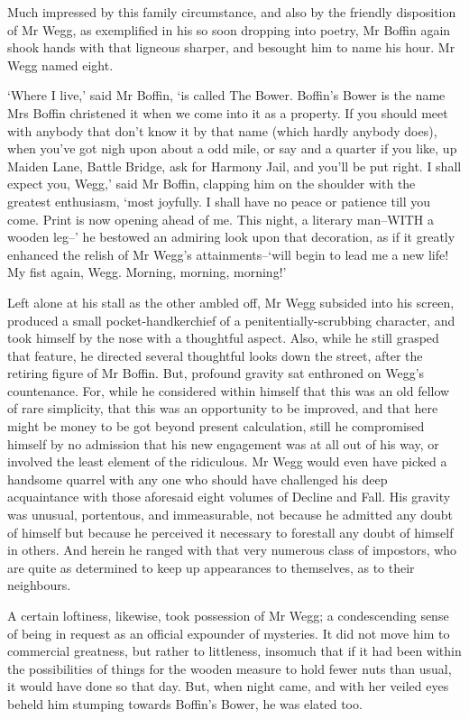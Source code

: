 Much impressed by this family circumstance, and also by the friendly
disposition of Mr Wegg, as exemplified in his so soon dropping into
poetry, Mr Boffin again shook hands with that ligneous sharper, and
besought him to name his hour. Mr Wegg named eight.

‘Where I live,’ said Mr Boffin, ‘is called The Bower. Boffin’s Bower is
the name Mrs Boffin christened it when we come into it as a property.
If you should meet with anybody that don’t know it by that name (which
hardly anybody does), when you’ve got nigh upon about a odd mile, or
say and a quarter if you like, up Maiden Lane, Battle Bridge, ask for
Harmony Jail, and you’ll be put right. I shall expect you, Wegg,’ said
Mr Boffin, clapping him on the shoulder with the greatest enthusiasm,
‘most joyfully. I shall have no peace or patience till you come. Print
is now opening ahead of me. This night, a literary man--WITH a wooden
leg--’ he bestowed an admiring look upon that decoration, as if it
greatly enhanced the relish of Mr Wegg’s attainments--‘will begin to
lead me a new life! My fist again, Wegg. Morning, morning, morning!’

Left alone at his stall as the other ambled off, Mr Wegg subsided
into his screen, produced a small pocket-handkerchief of a
penitentially-scrubbing character, and took himself by the nose with
a thoughtful aspect. Also, while he still grasped that feature, he
directed several thoughtful looks down the street, after the retiring
figure of Mr Boffin. But, profound gravity sat enthroned on Wegg’s
countenance. For, while he considered within himself that this was
an old fellow of rare simplicity, that this was an opportunity to
be improved, and that here might be money to be got beyond present
calculation, still he compromised himself by no admission that his new
engagement was at all out of his way, or involved the least element of
the ridiculous. Mr Wegg would even have picked a handsome quarrel with
any one who should have challenged his deep acquaintance with those
aforesaid eight volumes of Decline and Fall. His gravity was unusual,
portentous, and immeasurable, not because he admitted any doubt of
himself but because he perceived it necessary to forestall any doubt of
himself in others. And herein he ranged with that very numerous class
of impostors, who are quite as determined to keep up appearances to
themselves, as to their neighbours.

A certain loftiness, likewise, took possession of Mr Wegg; a
condescending sense of being in request as an official expounder of
mysteries. It did not move him to commercial greatness, but rather to
littleness, insomuch that if it had been within the possibilities of
things for the wooden measure to hold fewer nuts than usual, it would
have done so that day. But, when night came, and with her veiled eyes
beheld him stumping towards Boffin’s Bower, he was elated too.

